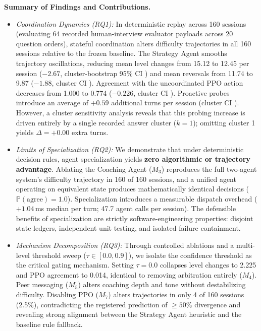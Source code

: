 \noindent\textbf{Summary of Findings and Contributions.}
\begin{itemize}
\item \emph{Coordination Dynamics (RQ1):} In deterministic replay across 160 sessions (evaluating 64 recorded human-interview evaluator payloads across 20 question orders), stateful coordination alters difficulty trajectories in all 160 sessions relative to the frozen baseline. The Strategy Agent smooths trajectory oscillations, reducing mean level changes from 15.12 to 12.45 per session ($-2.67$, cluster-bootstrap 95\% CI \phchgci{}) and mean reversals from 11.74 to 9.87 ($-1.88$, cluster CI \phrevci{}). Agreement with the uncoordinated PPO action decreases from 1.000 to 0.774 ($-0.226$, cluster CI \phagrci{}). Proactive probes introduce an average of $+0.59$ additional turns per session (cluster CI \phfuci{}). However, a cluster sensitivity analysis reveals that this probing increase is driven entirely by a single recorded answer cluster ($k=1$); omitting cluster 1 yields $\Delta = +0.00$ extra turns.
\item \emph{Limits of Specialization (RQ2):} We demonstrate that under deterministic decision rules, agent specialization yields \textbf{zero algorithmic or trajectory advantage}. Ablating the Coaching Agent ($M_3$) reproduces the full two-agent system's difficulty trajectory in 160 of 160 sessions, and a unified agent operating on equivalent state produces mathematically identical decisions ($\mathbb{P}(\text{agree}) = 1.0$). Specialization introduces a measurable dispatch overhead ($+1.04$\,ms median per turn; 47.7 agent calls per session). The defensible benefits of specialization are strictly software-engineering properties: disjoint state ledgers, independent unit testing, and isolated failure containment.
\item \emph{Mechanism Decomposition (RQ3):} Through controlled ablations and a multi-level threshold sweep ($\tau \in [0.0, 0.9]$), we isolate the confidence threshold as the critical gating mechanism. Setting $\tau = 0.0$ collapses level changes to 2.225 and PPO agreement to 0.014, identical to removing arbitration entirely ($M_4$). Peer messaging ($M_5$) alters coaching depth and tone without destabilizing difficulty. Disabling PPO ($M_7$) alters trajectories in only 4 of 160 sessions (2.5\%), contradicting the registered prediction of $\ge 50\%$ divergence and revealing strong alignment between the Strategy Agent heuristic and the baseline rule fallback.
\end{itemize}

